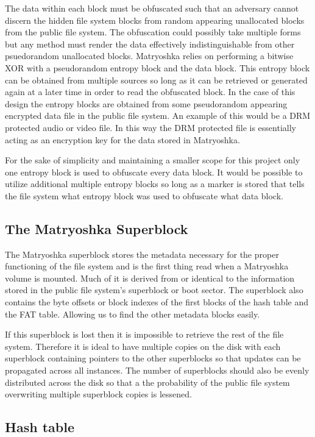 \documentclass{article}
\begin{document}
\begin{multicols}{2}
The data within each block must be obfuscated such that an adversary cannot discern the hidden file system blocks from random appearing unallocated blocks from the public file system. The obfuscation could possibly take multiple forms but any method must render the data effectively indistinguishable from other psuedorandom unallocated blocks. Matryoshka relies on performing a bitwise XOR with a pseudorandom entropy block and the data block. This entropy block can be obtained from multiple sources so long as it can be retrieved or generated again at a later time in order to read the obfuscated block. In the case of this design the entropy blocks are obtained from some   pseudorandom appearing encrypted data file in the public file system. An example of this would be a DRM protected audio or video file. In this way the DRM protected file is essentially acting as an encryption key for the data stored in Matryoshka.

For the sake of simplicity and maintaining a smaller scope for this project only one entropy block is used to obfuscate every data block. It would be possible to utilize additional multiple entropy blocks so long as a marker is stored that tells the file system what entropy block was used to obfuscate what data block.

\subsection{The Matryoshka Superblock}
The Matryoshka superblock stores the metadata necessary for the proper functioning of the file system and is the first thing read when a Matryoshka volume is mounted. Much of it is derived from or identical to the information stored in the public file system's superblock or boot sector. The superblock also contains the byte offsets or block indexes of the first blocks of the hash table and the FAT table. Allowing us to find the other metadata blocks easily.

If this superblock is lost then it is impossible to retrieve the rest of the file system. Therefore it is ideal to have multiple copies on the disk with each superblock containing pointers to the other superblocks so that updates can be propagated across all instances. The number of superblocks should also be evenly distributed across the disk so that a the probability of the public file system overwriting multiple superblock copies is lessened.

\subsection{Hash table}


\end{multicols}
\end{document}
